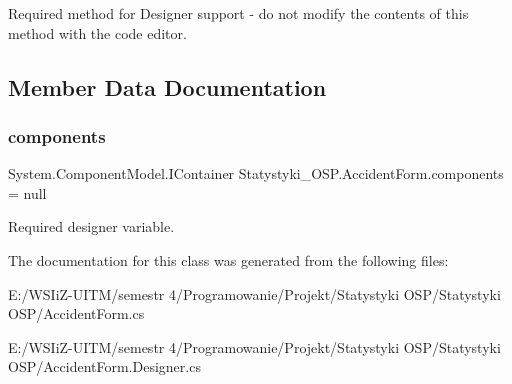 Required method for Designer support -\/ do not modify the contents of this method with the code editor. 



\subsection{Member Data Documentation}
\mbox{\label{class_statystyki___o_s_p_1_1_accident_form_aaadd06e4110b8e8f7858f98e0ebaed72}} 
\subsubsection{\texorpdfstring{components}{components}}
{\footnotesize\ttfamily System.\+Component\+Model.\+I\+Container Statystyki\+\_\+\+O\+S\+P.\+Accident\+Form.\+components = null\hspace{0.3cm}{\ttfamily [private]}}



Required designer variable. 



The documentation for this class was generated from the following files\+:\begin{DoxyCompactItemize}
\item 
E\+:/\+W\+S\+Ii\+Z-\/\+U\+I\+T\+M/semestr 4/\+Programowanie/\+Projekt/\+Statystyki O\+S\+P/\+Statystyki O\+S\+P/Accident\+Form.\+cs\item 
E\+:/\+W\+S\+Ii\+Z-\/\+U\+I\+T\+M/semestr 4/\+Programowanie/\+Projekt/\+Statystyki O\+S\+P/\+Statystyki O\+S\+P/Accident\+Form.\+Designer.\+cs\end{DoxyCompactItemize}
